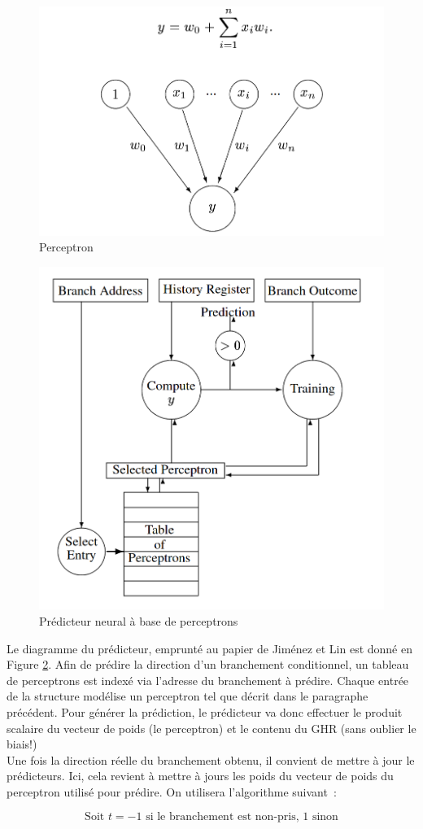 \documentclass[a4paper]{article}
\begin{document}
\begin{figure}[hbt]\center\leavevmode
	\includegraphics[width=0.5\linewidth]{1perceptron}
	\caption{Perceptron}
	\label{1perceptron}
\end{figure}

      \begin{figure}[hbt]\center\leavevmode
	\includegraphics[width=0.5\linewidth]{perceptron}
	\caption{Prédicteur neural à base de perceptrons}
	\label{perceptron}
\end{figure}

Le diagramme du prédicteur, emprunté au papier de Jiménez et Lin est donné en Figure \ref{perceptron}. Afin de prédire la direction d'un branchement conditionnel, un tableau de perceptrons est indexé via l'adresse du branchement à prédire. Chaque entrée de la structure modélise un perceptron tel que décrit dans le paragraphe précédent. Pour générer la prédiction, le prédicteur va donc effectuer le produit scalaire du vecteur de poids (le perceptron) et le contenu du GHR (sans oublier le biais!) \\

Une fois la direction réelle du branchement obtenu, il convient de mettre à jour le prédicteurs. Ici, cela revient à mettre à jours les poids du vecteur de poids du perceptron utilisé pour prédire. On utilisera l'algorithme suivant~:

\begin{equation*}
\text{Soit~} t = -1 \text{~si le branchement est non-pris, 1 sinon}
\end{equation*}
\end{document}
